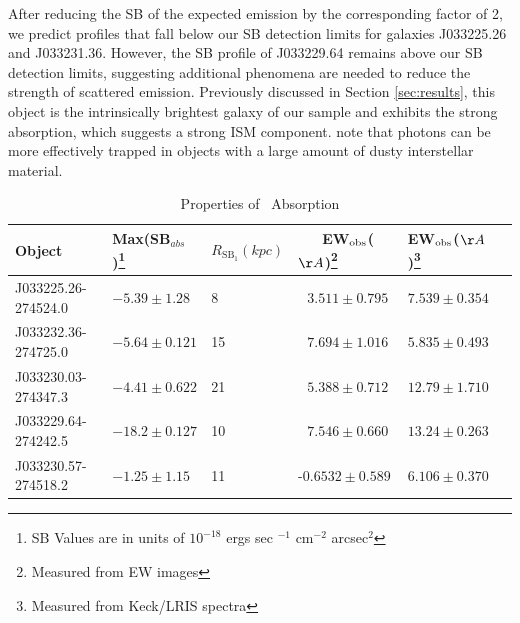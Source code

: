 \documentclass[twocolumn]{aastex61}
\begin{document}
After reducing the SB of the expected  emission by the corresponding factor of 2, we predict profiles that fall below our SB detection limits for galaxies J033225.26 and J033231.36. However, the SB profile of J033229.64 remains above our SB detection limits, suggesting additional phenomena are needed to reduce the strength of scattered emission. Previously discussed in Section \ref{sec:results}, this object is the intrinsically brightest galaxy of our sample and exhibits the strong  absorption, which suggests a strong ISM component. \cite{Prochaska_2011} note that  photons can be more effectively trapped in objects with a large amount of dusty interstellar material.


\begin{table}[]
\centering
\caption{Properties of \ Absorption\label{tab:abs_props}}  
\begin{tabular}{llllll} \hline \hline
Object & Max(SB$_{abs}$)\footnote{SB Values are in units of $10^{-18}$ ergs sec $^{-1}$ cm$^{-2}$ arcsec$^2$} & $R_{\text{SB}_1}(kpc)$ &\ \ \ EW$_{\rm{obs}}$($\AA$)\footnote{ Measured from EW images} & EW$_{\rm{obs}}$($\AA$)\footnote{Measured from Keck/LRIS spectra}  \\  \hline
J033225.26-274524.0 &  $-5.39 \pm 1.28 $ & 8 &     $\ \ \ 3.511 \pm 0.795$ & $7.539 \pm 0.354 $\\
J033232.36-274725.0 &  $-5.64 \pm 0.121 $ & 15 & $\ \ \ 7.694 \pm 1.016$ & $5.835 \pm 0.493$\\
J033230.03-274347.3 &  $-4.41 \pm 0.622 $ & 21 & $\ \ \ 5.388 \pm 0.712$ & $12.79 \pm 1.710$\\
J033229.64-274242.5 &  $-18.2 \pm 0.127 $ & 10 & $\ \ \ 7.546 \pm 0.660$ & $13.24 \pm 0.263$\\
J033230.57-274518.2 &  $-1.25 \pm 1.15   $ & 11& -$0.6532 \pm 0.589$ & $6.106 \pm 0.370$\\ \hline
\end{tabular}
\end{table}
\end{document}
